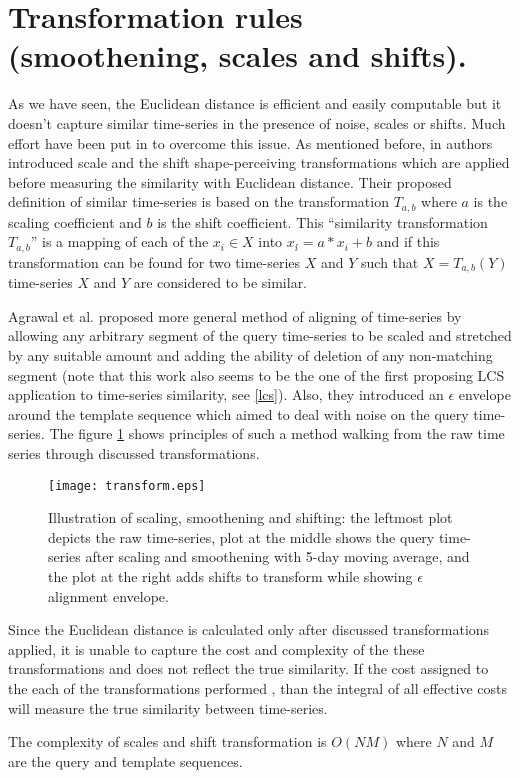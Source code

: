 \section{Transformation rules (smoothening, scales and shifts).} \label{scales_and_shifts}
As we have seen, the Euclidean distance is efficient and easily computable but it doesn't capture similar time-series in the presence of noise, scales or shifts. Much effort have been put in to overcome this issue. As mentioned before, in \cite{citeulike:3815880} authors introduced scale and the shift shape-perceiving transformations which are applied before measuring the similarity with Euclidean distance. Their proposed definition of similar time-series is based on the transformation $T_{a,b}$ where $a$ is the scaling coefficient and $b$ is the shift coefficient. This ``similarity transformation $T_{a,b}$'' is a mapping of each of the $x_{i} \in X$ into $x_{i}\acute{} = a*x_{i}+b$ and if this transformation can be found for two time-series $X$ and $Y$ such that $X=T_{a,b}(Y)$ time-series $X$ and $Y$ are considered to be similar.

Agrawal et al. \cite{citeulike:3816327} proposed more general method of aligning of time-series by allowing any arbitrary segment of the query time-series to be scaled and stretched by any suitable amount and adding the ability of deletion of any non-matching segment (note that this work also seems to be the one of the first proposing LCS application to time-series similarity, see \ref{lcs}). Also, they introduced an $\epsilon$ envelope around the template sequence which aimed to deal with noise on the query time-series. The figure  \ref{fig:transform} shows principles of such a method walking from the raw time series through discussed transformations.

\begin{figure}[tbp]
   \centering
   \texttt{[image: transform.eps]}
   \caption{Illustration of scaling, smoothening and shifting: the leftmost plot depicts the raw time-series, plot at the middle shows the query time-series after scaling and smoothening with 5-day moving average, and the plot at the right adds shifts to transform while showing $\epsilon$ alignment envelope.}
   \label{fig:transform}
\end{figure} 

Since the Euclidean distance is calculated only after discussed transformations applied, it is unable to capture the cost and complexity of the these transformations and does not reflect the true similarity. If the cost assigned to the each of the transformations performed \cite{citeulike:3731711}, than the integral of all effective costs will measure the true similarity between time-series.

The complexity of scales and shift transformation is $O(NM)$ where $N$ and $M$ are the query and template sequences.

